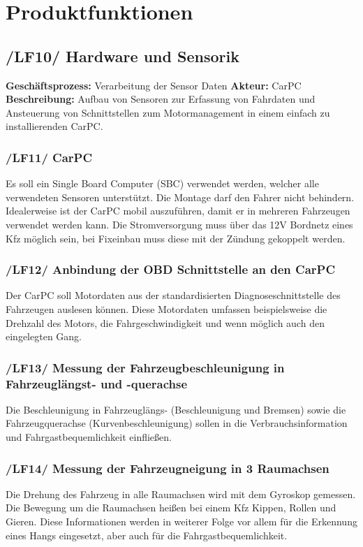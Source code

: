 \chapter{Produktfunktionen}

\section{/LF10/ Hardware und Sensorik}
\textbf{Geschäftsprozess:}	Verarbeitung der Sensor Daten
\newline
\textbf{Akteur:}		CarPC
\newline
\textbf{Beschreibung:}	Aufbau von Sensoren zur Erfassung von Fahrdaten und Ansteuerung von Schnittstellen zum Motormanagement in einem einfach zu installierenden CarPC.

\subsection{/LF11/ CarPC}
Es soll ein Single Board Computer (SBC) verwendet werden, welcher alle verwendeten Sensoren unterstützt. Die Montage darf den Fahrer nicht behindern. Idealerweise ist der CarPC mobil auszuführen, damit er in mehreren Fahrzeugen verwendet werden kann. Die Stromversorgung muss über das 12V Bordnetz eines Kfz möglich sein, bei Fixeinbau muss diese mit der Zündung gekoppelt werden.

\subsection{/LF12/ Anbindung der OBD Schnittstelle an den CarPC}
Der CarPC soll Motordaten aus der standardisierten Diagnoseschnittstelle des Fahrzeugen auslesen können. Diese Motordaten umfassen beispielsweise die Drehzahl des Motors, die Fahrgeschwindigkeit und wenn möglich auch den eingelegten Gang.

\subsection{/LF13/ Messung der Fahrzeugbeschleunigung in Fahrzeuglängst- und -querachse}
Die Beschleunigung in Fahrzeuglängs- (Beschleunigung und Bremsen) sowie die Fahrzeugquerachse (Kurvenbeschleunigung) sollen in die Verbrauchsinformation und Fahrgastbequemlichkeit einfließen.

\subsection{/LF14/ Messung der Fahrzeugneigung in 3 Raumachsen}
Die Drehung des Fahrzeug in alle Raumachsen wird mit dem Gyroskop gemessen. Die Bewegung um die Raumachsen heißen bei einem Kfz Kippen, Rollen und Gieren. Diese Informationen werden in weiterer Folge vor allem für die Erkennung eines Hangs eingesetzt, aber auch für die Fahrgastbequemlichkeit.

